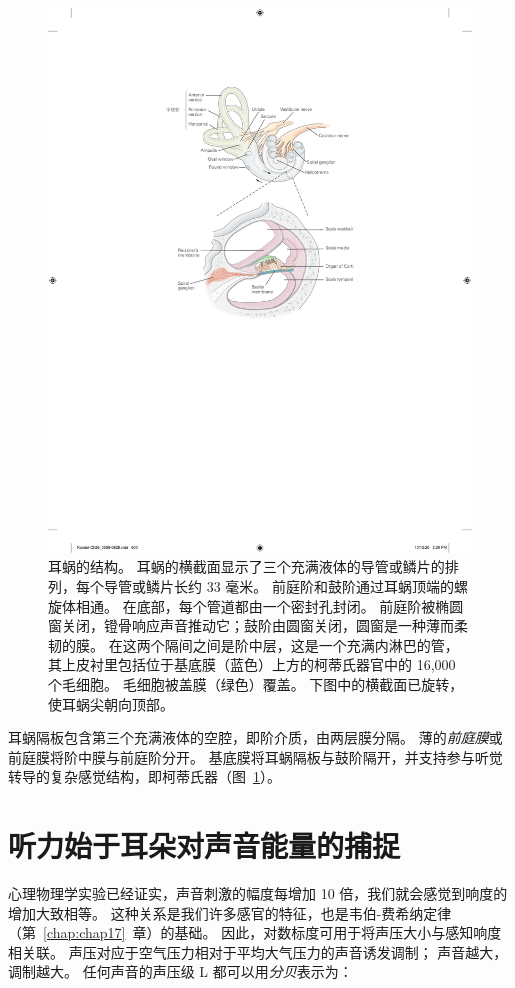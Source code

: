 \begin{figure}[htbp]
	\centering
	\includegraphics[width=0.7\linewidth]{chap26/fig_26_2}
	\caption{耳蜗的结构。 
		耳蜗的横截面显示了三个充满液体的导管或鳞片的排列，每个导管或鳞片长约 33 毫米。
		前庭阶和鼓阶通过耳蜗顶端的螺旋体相通。
		在底部，每个管道都由一个密封孔封闭。
		前庭阶被椭圆窗关闭，镫骨响应声音推动它；鼓阶由圆窗关闭，圆窗是一种薄而柔韧的膜。
		在这两个隔间之间是阶中层，这是一个充满内淋巴的管，其上皮衬里包括位于基底膜（蓝色）上方的柯蒂氏器官中的 16,000 个毛细胞。
		毛细胞被盖膜（绿色）覆盖。
		下图中的横截面已旋转，使耳蜗尖朝向顶部。}
	\label{fig:26_2}
\end{figure}


耳蜗隔板包含第三个充满液体的空腔，即阶介质，由两层膜分隔。
薄的\textit{前庭膜}或前庭膜将阶中膜与前庭阶分开。
基底膜将耳蜗隔板与鼓阶隔开，并支持参与听觉转导的复杂感觉结构，即柯蒂氏器（图~\ref{fig:26_2}）。



\section{听力始于耳朵对声音能量的捕捉}

心理物理学实验已经证实，声音刺激的幅度每增加 10 倍，我们就会感觉到响度的增加大致相等。
这种关系是我们许多感官的特征，也是韦伯-费希纳定律（第~\ref{chap:chap17}~章）的基础。
因此，对数标度可用于将声压大小与感知响度相关联。 
声压对应于空气压力相对于平均大气压力的声音诱发调制；
声音越大，调制越大。
任何声音的声压级 L 都可以用\textit{分贝}表示为：


